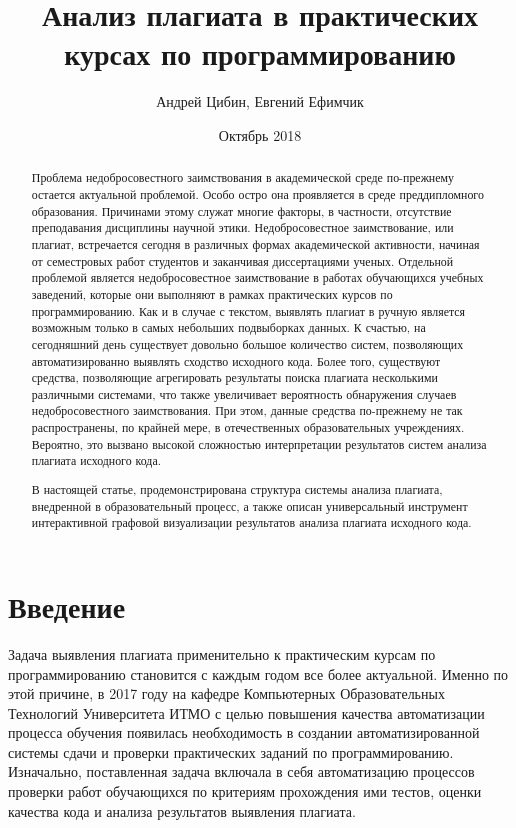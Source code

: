 \documentclass{article}
\title{Анализ плагиата в практических курсах по программированию}
\author{Андрей Цибин, Евгений Ефимчик}
\date{Октябрь 2018}
\begin{document}
\maketitle

\begin{abstract}

Проблема недобросовестного заимствования в академической среде по-прежнему остается актуальной проблемой. Особо остро она проявляется в среде преддипломного образования. Причинами этому служат многие факторы, в частности, отсутствие преподавания дисциплины научной этики. Недобросовестное заимствование, или плагиат, встречается сегодня в различных формах академической активности, начиная от семестровых работ студентов и заканчивая диссертациями ученых. Отдельной проблемой является недобросовестное заимствование в работах обучающихся учебных заведений, которые они выполняют в рамках практических курсов по программированию. Как и в случае с текстом, выявлять плагиат в ручную является возможным только в самых небольших подвыборках данных. К счастью, на сегодняшний день существует довольно большое количество систем, позволяющих автоматизированно выявлять сходство исходного кода. Более того, существуют средства, позволяющие агрегировать результаты поиска плагиата несколькими различными системами, что также увеличивает вероятность обнаружения случаев недобросовестного заимствования. При этом, данные средства по-прежнему не так распространены, по крайней мере, в отечественных образовательных учреждениях. Вероятно, это вызвано высокой сложностью интерпретации результатов систем анализа плагиата исходного кода.

В настоящей статье, продемонстрирована структура системы анализа плагиата, внедренной в образовательный процесс, а также описан универсальный инструмент интерактивной графовой визуализации результатов анализа плагиата исходного кода.

\end{abstract}

\section{Введение}

Задача выявления плагиата применительно к практическим курсам по программированию становится с каждым годом все более актуальной. Именно по этой причине, в 2017 году на кафедре Компьютерных Образовательных Технологий Университета ИТМО с целью повышения качества автоматизации процесса обучения появилась необходимость в создании автоматизированной системы сдачи и проверки практических заданий по программированию. Изначально, поставленная задача включала в себя автоматизацию процессов проверки работ обучающихся по критериям прохождения ими тестов, оценки качества кода и анализа результатов выявления плагиата.
\end{document}
